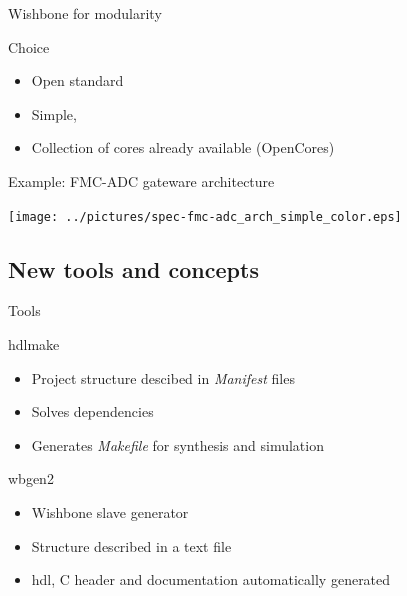 \documentclass[compress,red]{beamer}
\begin{document}
\begin{frame}{Wishbone for modularity}

  \begin{block}{Choice}
    \begin{itemize}
    \item Open standard
    \item Simple, %
    \item Collection of cores already available (OpenCores)
    \end{itemize}
  \end{block}


\end{frame}

\begin{frame}{Example: FMC-ADC gateware architecture}

  \begin{center}
    \texttt{[image: ../pictures/spec-fmc-adc\_arch\_simple\_color.eps]}
  \end{center}

\end{frame}

\subsection{New tools and concepts}

\begin{frame}{Tools}

  \begin{block}{hdlmake}
    \begin{itemize}
    \item Project structure descibed in \textit{Manifest} files
    \item Solves dependencies
    \item Generates \textit{Makefile} for synthesis and simulation
    \end{itemize}
  \end{block}

  \begin{block}{wbgen2}
    \begin{itemize}
    \item Wishbone slave generator
    \item Structure described in a text file
    \item hdl, C header and documentation automatically generated
    \end{itemize}
  \end{block}


\end{frame}
\end{document}
